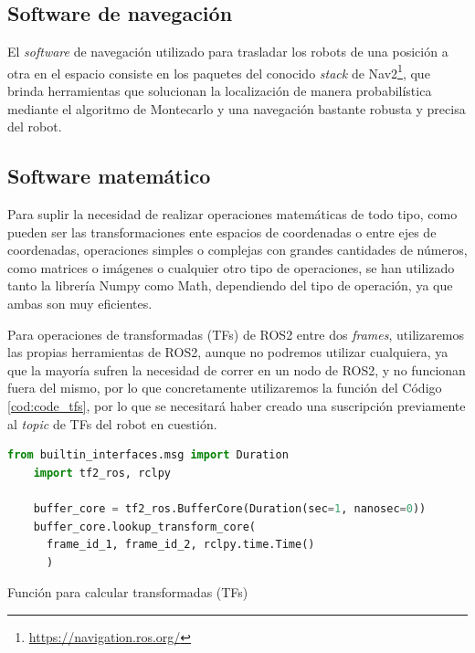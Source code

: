 \subsection{Software de navegación}
\label{sec:navegacion}

El \textit{software} de navegación utilizado para trasladar los robots de una
posición a otra en el espacio consiste en los paquetes del conocido
\textit{stack} de Nav2\footnote{\url{https://navigation.ros.org/}}, que brinda
herramientas que solucionan la localización de manera probabilística mediante el
algoritmo de Montecarlo y una navegación bastante robusta y precisa del robot.

\subsection{Software matemático}
\label{sec:software_matematico}

Para suplir la necesidad de realizar operaciones matemáticas de todo tipo, como
pueden ser las transformaciones ente espacios de coordenadas o entre ejes de
coordenadas, operaciones simples o complejas con grandes cantidades de números,
como matrices o imágenes o cualquier otro tipo de operaciones, se han utilizado
tanto la librería Numpy como Math, dependiendo del tipo de operación, ya que
ambas son muy eficientes.

Para operaciones de transformadas (TFs) de ROS2 entre dos \textit{frames},
utilizaremos las propias herramientas de ROS2, aunque no podremos utilizar
cualquiera, ya que la mayoría sufren la necesidad de correr en un nodo de ROS2,
y no funcionan fuera del mismo, por lo que concretamente utilizaremos la
función del Código \ref{cod:code_tfs}, por lo que se necesitará haber creado una
suscripción previamente al \textit{topic} de TFs del robot en cuestión.

\begin{code}[h!]
  \begin{lstlisting}[language=Python]
    from builtin_interfaces.msg import Duration
    import tf2_ros, rclpy

    buffer_core = tf2_ros.BufferCore(Duration(sec=1, nanosec=0))
    buffer_core.lookup_transform_core(
      frame_id_1, frame_id_2, rclpy.time.Time()
      )
  \end{lstlisting}
  \caption[Función para calcular transformadas]{Función para calcular transformadas (TFs)}
  \label{cod:code_tfs}
\end{code}


